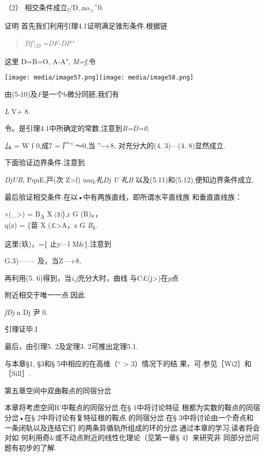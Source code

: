 \documentclass{article}
\begin{document}
（2）
相交条件成立\textsubscript{!}/D,.no\textsubscript{\textgreater{}}\^{}0.

证明 首先我们利用引理4.1证明满足锥形条件.根据链

\begin{quote}
\emph{Df\textbackslash{}\textsubscript{D} =DF-DP"}
\end{quote}

这里 D=B=O, A-A", \emph{M=f,}令

\texttt{[image: media/image57.png]}\texttt{[image: media/image58.png]}

由(5-10)及\emph{F}是一个b微分同胚,我们有

\emph{L} V+ 8.

令。是引理4.1中所确定的常数,注意到\emph{B=D=0,}

\textbar{}厶\textbar{} = W\textbar{} f 0,成7\textbar{} =
\textbar{}厂''\textbar{} 〜0,当 ''\textasciitilde{}+8, 对充分大的(4.
3)---(4. 8)显然成立.

下面验证边界条件.注意到

\emph{DjUB,} PquE,戸(次 Z\textgreater{}f) uaq,\emph{礼Dj U 礼B}
以及(5.11)和(5.12),便知边界条件成立.

最后验证相交条件.在以•中有两族直线，即所谓水平直线族 和垂直直线族：

«(\_\textgreater{}) = B\textsubscript{A} X ⑶\},r G (R)。，\\
q(z) = \{苗 X (£\textgreater{}A，z G \emph{B\textsubscript{k}.}

这里(玖)，=\{ \textbar{}止y---l \textbar{}M\&\}.注意到

G.3)--- --- 及，当Z---+8,

再利用(5. 6)得到，当\emph{i,j}充分大时，曲线
与C£(j\textgreater{})在\emph{p}点

附近相交于唯一一点.因此

\emph{fDj} n Dj 尹 0.

引理证毕.I

最后，由引理5. 2及定理3. 2可推出定理5.1.

与本章§1, §3和§ 5中相应的在高维（`` \textgreater{} 3）情况下的结
果，可.参见［Wi2］和［Sill］.

\protect\hypertarget{bookmark236}{}{}第五章空间中双曲鞍点的同宿分岔

本章将考虑空间R'中鞍点的同宿分岔.在§ 1中将讨论特征
根都为实数的鞍点的同宿分岔•在§ 2中将讨论有复特征根的鞍点 的同宿分岔.在§
3中将讨论由一个奇点和一条闭轨以及连结它们
的两条异循轨所组成的环的分岔.通过本章的学习,读者将会对如
何利用奇\&或不动点附近的线性化理论（见第一章§ 4）来研究非
同部分岔问题有初步的了解.
\end{document}
